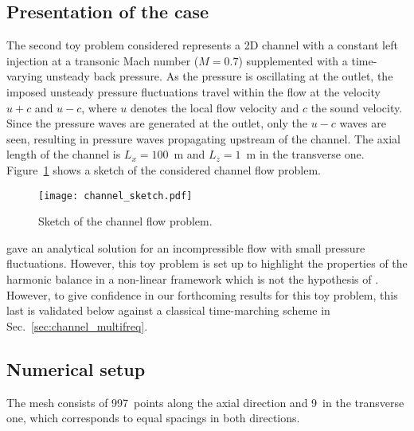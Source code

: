 \subsection{Presentation of the case}
\label{sub:presentation_of_the_case}

The second toy problem considered represents a 2D channel 
with a constant left injection at 
a transonic Mach number ($M=0.7$)
supplemented with a time-varying unsteady back pressure.
As the pressure is oscillating at the outlet, the imposed unsteady pressure
fluctuations travel within the flow at the velocity 
$u + c$ and $u - c$, where $u$ denotes 
the local flow velocity and $c$ the sound velocity.
Since the pressure waves are generated at the outlet, only
the $u-c$ waves are seen, resulting in pressure waves propagating
upstream of the channel. The axial length of the channel is $L_x = 100$~m
and $L_z = 1$~m in the transverse one.
Figure~\ref{fig:canal_principle} shows a sketch
of the considered channel flow problem.
\begin{figure}[htb]
  \centering
  \texttt{[image: channel\_sketch.pdf]}
  \caption{Sketch of the channel flow problem.}
  \label{fig:canal_principle}
\end{figure}

\citet{Merkle1987} gave an analytical solution
for an incompressible flow with small pressure fluctuations.
However, this toy problem is set up to highlight the properties
of the harmonic balance in a non-linear framework which is not
the hypothesis of \citet{Merkle1987}. However, to give confidence
in our forthcoming results for this toy problem,
this last is validated below against a classical time-marching scheme in
Sec.~\ref{sec:channel_multifreq}.

\subsection{Numerical setup}

The mesh consists of 997~points along the axial direction and 9~in the
transverse one, which corresponds to equal spacings in both
directions. 

